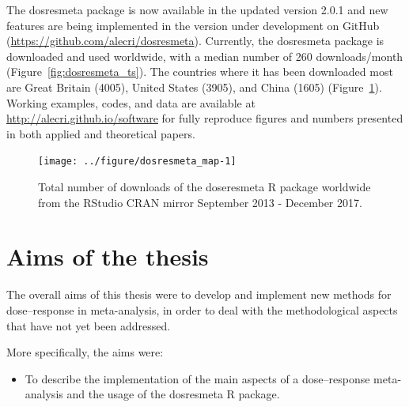 \documentclass[11pt,a4paper,twoside,openany]{book}\usepackage{knitr}
\newcommand{\pkg}[1]{{\fontseries{b}\selectfont #1}}
\begin{document}
{The \pkg{dosresmeta} package is now available in the updated version 2.0.1 and new features are being implemented in the version under development on GitHub (\url{https://github.com/alecri/dosresmeta}). Currently, the \pkg{dosresmeta} package is downloaded and used worldwide, with a median number of 260 downloads/month (Figure~\ref{fig:dosresmeta_ts}). The countries where it has been downloaded most are Great Britain (4005), United States (3905), and China (1605) (Figure~\ref{fig:dosresmeta_map}). Working examples, codes, and data are available at \url{http://alecri.github.io/software} for fully reproduce figures and numbers presented in both applied and theoretical papers.

\begin{knitrout}\footnotesize
{}\color{fgcolor}\begin{figure}[ht!]

{\centering \texttt{[image: ../figure/dosresmeta\_map-1]} 

}

\caption[Total number of downloads of the doseresmeta R package worldwide from the RStudio CRAN mirror September 2013 - December 2017]{Total number of downloads of the doseresmeta R package worldwide from the RStudio CRAN mirror September 2013 - December 2017.}\label{fig:dosresmeta_map}
\end{figure}


\end{knitrout}



%

\chapter{Aims of the thesis}

The overall aims of this thesis were to develop and implement new methods for dose--response in meta-analysis, in order to deal with the methodological aspects that have not yet been addressed.

\bigskip

More specifically, the aims were:

\begin{itemize}
\item To describe the implementation of the main aspects of a dose--response meta-analysis and the usage of the \pkg{dosresmeta} \textsf{R} package.


\end{itemize}}
\end{document}
